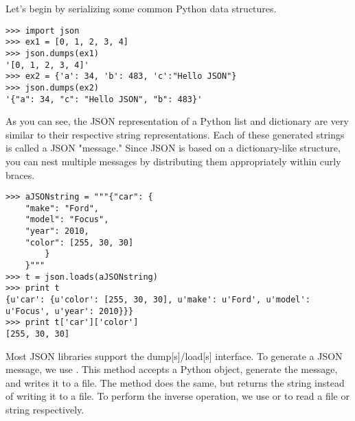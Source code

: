 Let's begin by serializing some common Python data structures.
\begin{lstlisting}
>>> import json
>>> ex1 = [0, 1, 2, 3, 4]
>>> json.dumps(ex1)
'[0, 1, 2, 3, 4]'
>>> ex2 = {'a': 34, 'b': 483, 'c':"Hello JSON"}
>>> json.dumps(ex2)
'{"a": 34, "c": "Hello JSON", "b": 483}'
\end{lstlisting}
As you can see, the JSON representation of a Python list and dictionary are very similar to their respective string representations.
Each of these generated strings is called a JSON "message."
Since JSON is based on a dictionary-like structure, you can nest multiple messages by distributing them appropriately within curly braces.
\begin{lstlisting}
>>> aJSONstring = """{"car": {
    "make": "Ford",
    "model": "Focus",
    "year": 2010,
    "color": [255, 30, 30]
        }
    }"""
>>> t = json.loads(aJSONstring)
>>> print t
{u'car': {u'color': [255, 30, 30], u'make': u'Ford', u'model': u'Focus', u'year': 2010}}}
>>> print t['car']['color']
[255, 30, 30]
\end{lstlisting}

Most JSON libraries support the dump[s]/load[s] interface.
To generate a JSON message, we use . This method accepts a Python object, generate the message, and writes it to a file.
The method  does the same, but returns the string instead of writing it to a file.
To perform the inverse operation, we use  or  to read a file or string respectively.

